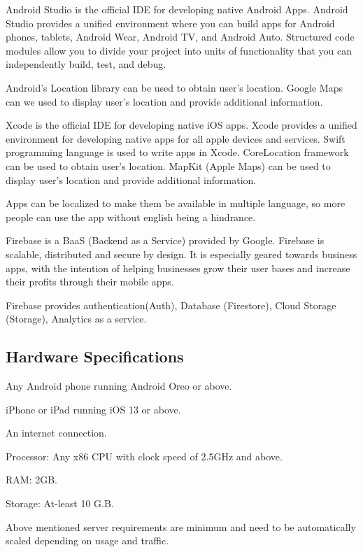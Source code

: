 \documentclass[../Report.tex]{subfiles}
\begin{document}
\begin{description}
  \item[Android Studio:] Android Studio\cite{android} is the official IDE for developing native Android Apps. Android Studio provides a unified  
  environment where you can build apps for Android phones, tablets, Android Wear, Android TV, and Android Auto. Structured code modules 
  allow you to  divide your project into units of functionality that you can independently build, test, and debug.\par
  Android's Location library can be used to obtain user's location. Google Maps can we used to display user's location and provide 
  additional information.

  \item[Xcode:] Xcode\cite{ios} is the official IDE for developing native iOS apps. Xcode provides a unified environment for developing native apps 
  for all apple devices and services. Swift programming language is used to write apps in Xcode. CoreLocation framework can be used to 
  obtain user's location. MapKit (Apple Maps) can be used to display user's location and provide additional information.\par

  \item Apps can be localized to make them be available in multiple language, so more people can use the app without english being a 
  hindrance.

  \item[Firebase:] Firebase\cite{firebase} is a BaaS (Backend as a Service) provided by Google. Firebase is scalable, distributed and secure by design. It is especially
  geared towards business apps, with the intention of helping businesses grow their user bases and increase their profits through their mobile apps.\par
  Firebase provides authentication(Auth), Database (Firestore), Cloud Storage (Storage), Analytics as a service.
\end{description}

\subsection{Hardware Specifications}

\begin{description}
  \item[User Device Requirements:]
  \item Any Android phone running Android Oreo or above.
  \item iPhone or iPad running iOS 13 or above.
  \item An internet connection.
  \item 
  
  \item [Minimum Server Requirements:]
  \item Processor: Any x86 CPU with clock speed of 2.5GHz and above.
  \item RAM: 2GB.
  \item Storage: At-least 10 G.B.
\end{description}
Above mentioned server requirements are minimum and need to be automatically scaled depending on usage and traffic.
\end{document}

